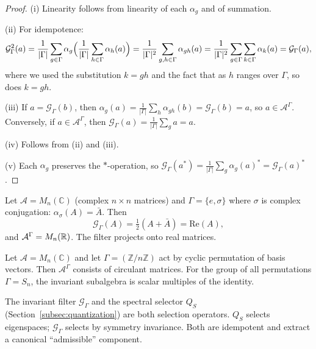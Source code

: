 \begin{proof}
(i) Linearity follows from linearity of each $\alpha_g$ and of summation.

(ii) For idempotence:
\[
\mathcal{G}_\Gamma^2(a) = \frac{1}{|\Gamma|} \sum_{g \in \Gamma} \alpha_g\Bigl( \frac{1}{|\Gamma|} \sum_{h \in \Gamma} \alpha_h(a) \Bigr)
= \frac{1}{|\Gamma|^2} \sum_{g,h \in \Gamma} \alpha_{gh}(a)
= \frac{1}{|\Gamma|^2} \sum_{g \in \Gamma} \sum_{k \in \Gamma} \alpha_k(a)
= \mathcal{G}_\Gamma(a),
\]
where we used the substitution $k = gh$ and the fact that as $h$ ranges over $\Gamma$, so does $k = gh$.

(iii) If $a = \mathcal{G}_\Gamma(b)$, then $\alpha_g(a) = \frac{1}{|\Gamma|} \sum_{h} \alpha_{gh}(b) = \mathcal{G}_\Gamma(b) = a$, so $a \in \mathcal{A}^\Gamma$.
Conversely, if $a \in \mathcal{A}^\Gamma$, then $\mathcal{G}_\Gamma(a) = \frac{1}{|\Gamma|} \sum_g a = a$.

(iv) Follows from (ii) and (iii).

(v) Each $\alpha_g$ preserves the $*$-operation, so $\mathcal{G}_\Gamma(a^*) = \frac{1}{|\Gamma|} \sum_g \alpha_g(a)^* = \mathcal{G}_\Gamma(a)^*$.
\end{proof}

\begin{example}
\label{ex:conjugation-filter}
Let $\mathcal{A} = M_n(\mathbb{C})$ (complex $n \times n$ matrices) and $\Gamma = \{e, \sigma\}$ where $\sigma$ is complex conjugation: $\alpha_\sigma(A) = \bar{A}$.
Then
\[
\mathcal{G}_\Gamma(A) = \tfrac{1}{2}(A + \bar{A}) = \mathrm{Re}(A),
\]
and $\mathcal{A}^\Gamma = M_n(\mathbb{R})$.
The filter projects onto real matrices.
\end{example}

\begin{example}
\label{ex:diagonal-filter}
Let $\mathcal{A} = M_n(\mathbb{C})$ and let $\Gamma = (\mathbb{Z}/n\mathbb{Z})$ act by cyclic permutation of basis vectors.
Then $\mathcal{A}^\Gamma$ consists of circulant matrices.
For the group of all permutations $\Gamma = S_n$, the invariant subalgebra is scalar multiples of the identity.
\end{example}

\begin{remark}
The invariant filter $\mathcal{G}_\Gamma$ and the spectral selector $Q_S$ (Section~\ref{subsec:quantization}) are both selection operators.
$Q_S$ selects eigenspaces; $\mathcal{G}_\Gamma$ selects by symmetry invariance.
Both are idempotent and extract a canonical ``admissible'' component.
\end{remark}

